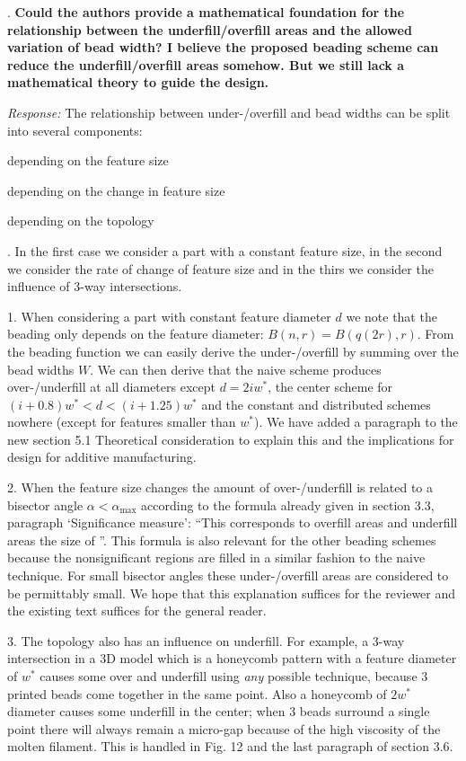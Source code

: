 \documentclass[5p,10pt,times]{elsarticle}
\theoremstyle{definition}
\newcommand{\revise}[2]{{\color{red}{#1}\color{blue}{#2}}}
\newcommand\Que[1]{%
   \leavevmode\par
   \refstepcounter{question}
   \noindent
   \thequestion. {\bf#1}\par}
\newcounter{question}
\numberwithin{question}{section}
\newcommand\Ans[2][]{%
    \leavevmode\par\noindent
   {%
    {\it Response:} \textbf{#1}#2\par}}
\begin{document}
\Que{
Could the authors provide a mathematical foundation for the relationship between the underfill/overfill areas and the allowed variation of bead width?
I believe the proposed beading scheme can reduce the underfill/overfill areas somehow.
But we still lack a mathematical theory to guide the design.
}
\Ans{
The relationship between under-/overfill and bead widths can be split into several components:
\begin{enumerate*}
\item depending on the feature size
\item depending on the change in feature size
\item depending on the topology
\end{enumerate*}
.
In the first case we consider a part with a constant feature size, in the second we consider the rate of change of feature size and in the thirs we consider the influence of 3-way intersections.

1. When considering a part with constant feature diameter $d$ we note that the beading only depends on the feature diameter: $B(n, r) = B(q(2r), r)$.
From the beading function we can easily derive the under-/overfill by summing over the bead widths $W$.
We can then derive that the naive scheme produces over-/underfill at all diameters except $d=2i w^*$, the center scheme for $(i + 0.8) w^* < d < (i+ 1.25) w^*$ and the constant and distributed schemes nowhere (except for features smaller than $w^*$).
We have added a paragraph to the new section 5.1 Theoretical consideration to explain this and the implications for design for additive manufacturing.

2. When the feature size changes the amount of over-/underfill is related to a bisector angle $\alpha < \alpha_\text{max}$ according to the formula already given in section 3.3, paragraph `Significance measure': 
``This corresponds to overfill areas and underfill areas the size of \revise{$\nicefrac12 (w^*)^2 \left( \nicefrac14 \tan ( \alpha / 2) - \alpha / 2 \right)$}{$\nicefrac14 (w^*)^2 \left( \tan ( \alpha / 2) - \alpha / 2 \right)$}''.
This formula is also relevant for the other beading schemes because the nonsignificant regions are filled in a similar fashion to the naive technique.
For small bisector angles these under-/overfill areas are considered to be permittably small.
We hope that this explanation suffices for the reviewer and the existing text suffices for the general reader.

3. The topology also has an influence on underfill. For example, a 3-way intersection in a 3D model which is a honeycomb pattern with a feature diameter of $w^*$ causes some over and underfill using \emph{any} possible technique, because 3 printed beads come together in the same point.
Also a honeycomb of $2w^*$ diameter causes some underfill in the center;
when 3 beads surround a single point there will always remain a micro-gap because of the high viscosity of the molten filament.
This is handled in Fig. 12 and the last paragraph of section 3.6.

}
\end{document}
